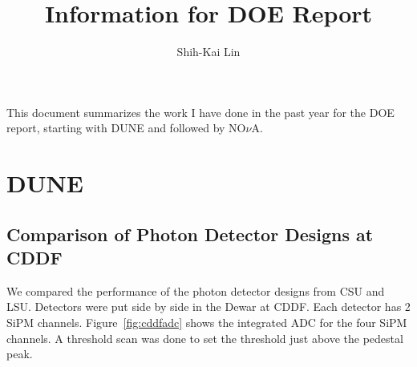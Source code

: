 \documentclass[12pt,a4paper,final]{iopart}
\begin{document}
\title[Information for DOE Report]{Information for DOE Report}
	
\author[cor1]{Shih-Kai Lin}
\address{Colorado State University}


%


\vspace{\baselineskip}
This document summarizes the work I have done in the past year for the DOE report, starting with DUNE and followed by NO$\nu$A.

\section{DUNE}

\subsection{Comparison of Photon Detector Designs at CDDF}
We compared the performance of the photon detector designs from CSU and LSU. Detectors were put side by side in the Dewar at CDDF. Each detector has 2 SiPM channels. Figure~\ref{fig:cddfadc} shows the integrated ADC for the four SiPM channels. A threshold scan was done to set the threshold just above the pedestal peak.
\end{document}
